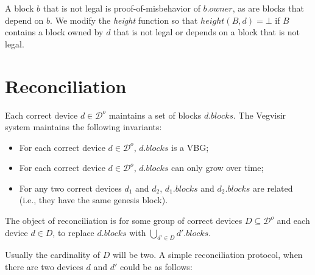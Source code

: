 \documentclass{article}
\begin{document}
A block $b$ that is not legal is proof-of-misbehavior of $b.\mathit{owner}$,
as are blocks that depend on $b$.
We modify the \textit{height} function so
that $\mathit{height}(B, d) = \bot$ if $B$ contains a block owned by $d$ that is not legal
or depends on a block that is not legal.

\section{Reconciliation}

Each correct device $d \in \mathcal{D}^o$ maintains a set of blocks $d.\mathit{blocks}$.
The Vegvisir system maintains the following invariants:

\begin{itemize}
\item For each correct device $d \in \mathcal{D}^o$, $d.\mathit{blocks}$ is a VBG;
\item For each correct device $d \in \mathcal{D}^o$, $d.\mathit{blocks}$ can only grow over time;
\item For any two correct devices $d_1$ and $d_2$, $d_1.\mathit{blocks}$ and $d_2.\mathit{blocks}$ are related (i.e., they have the same genesis block).
\end{itemize}

The object of reconciliation is for some group of correct devices $D \subseteq \mathcal{D}^o$
and each device $d \in D$, 
to replace $d.\mathit{blocks}$ with $\bigcup_{d' \in D} d'.\mathit{blocks}$.

Usually the cardinality of $D$ will be two.  A simple reconciliation protocol,
when there are two devices $d$ and $d'$ could be as follows:
\end{document}
